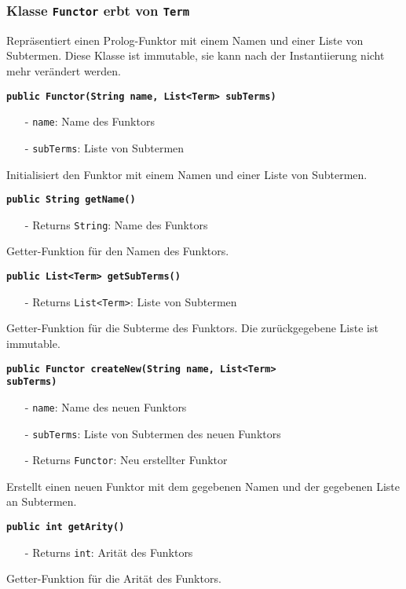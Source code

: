 \documentclass[parskip=full,11pt,twoside]{scrartcl}
\begin{document}
\subsubsection{Klasse \texttt{Functor} erbt von \texttt{Term}}
Repräsentiert einen Prolog-Funktor mit einem Namen und einer Liste von Subtermen. Diese Klasse ist immutable, sie kann nach der Instantiierung nicht mehr verändert werden.

\textbf{\texttt{public Functor(String name, List<Term> subTerms)}}
\begin{itemize}[noitemsep]
	\item[-] \texttt{name}: Name des Funktors
	\item[-] \texttt{subTerms}: Liste von Subtermen
\end{itemize}
Initialisiert den Funktor mit einem Namen und einer Liste von Subtermen.

\textbf{\texttt{public String getName()}}
\begin{itemize}[noitemsep]
	\item[-] Returns \texttt{String}: Name des Funktors
\end{itemize}
Getter-Funktion für den Namen des Funktors.

\textbf{\texttt{public List<Term> getSubTerms()}}
\begin{itemize}[noitemsep]
	\item[-] Returns \texttt{List<Term>}: Liste von Subtermen
\end{itemize}
Getter-Funktion für die Subterme des Funktors. Die zurückgegebene Liste ist immutable.

\textbf{\texttt{public Functor createNew(String name, List<Term>\\subTerms)}}
\begin{itemize}[noitemsep]
	\item[-] \texttt{name}: Name des neuen Funktors
	\item[-] \texttt{subTerms}: Liste von Subtermen des neuen Funktors
	\item[-] Returns \texttt{Functor}: Neu erstellter Funktor
\end{itemize}
Erstellt einen neuen Funktor mit dem gegebenen Namen und der gegebenen Liste an Subtermen.

\textbf{\texttt{public int getArity()}}
\begin{itemize}[noitemsep]
	\item[-] Returns \texttt{int}: Arität des Funktors
\end{itemize}
Getter-Funktion für die Arität des Funktors.
\end{document}
